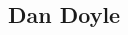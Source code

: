 \documentclass[12pt,oneside]{book}
\begin{document}
\begin{landscape}



\newpage

\section{Dan Doyle}
\begin{longtable}{|L{4in}|L{3.75in}|c|}


\end{longtable}
\end{landscape}
\end{document}
